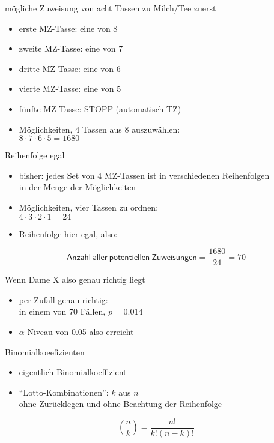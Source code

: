 \begin{frame}
  {mögliche Zuweisung von acht Tassen zu Milch\slash Tee zuerst}
  \begin{itemize}[<+->]
    \item erste MZ-Tasse: eine von 8
    \item zweite MZ-Tasse: eine von 7
    \item dritte MZ-Tasse: eine von 6
    \item vierte MZ-Tasse: eine von 5
    \item fünfte MZ-Tasse: STOPP (automatisch TZ)
    \item \alert{Möglichkeiten, 4 Tassen aus 8 auszuwählen:\\
      $8\cdot7\cdot6\cdot5=1680$}
  \end{itemize}
\end{frame}

\begin{frame}
  {Reihenfolge egal}
  \begin{itemize}[<+->]
    \item bisher: jedes Set von 4 MZ-Tassen ist in verschiedenen Reihenfolgen\\
      in der Menge der Möglichkeiten
    \item \alert{Möglichkeiten, vier Tassen zu ordnen:\\
      $4\cdot3\cdot2\cdot1=24$}
      \Zeile
    \item Reihenfolge hier egal, also:
  \end{itemize}
  \pause
  \begin{equation}
    \mathsf{Anzahl\ aller\ potentiellen\ Zuweisungen}=\frac{1680}{24}=70
  \end{equation}
\end{frame}

\begin{frame}
  {Wenn Dame X also genau richtig liegt}
  \begin{itemize}[<+->]
    \item per Zufall genau richtig:\\
      in einem von 70 Fällen, $p=0.014$
      \Zeile
    \item $\alpha$-Niveau von 0.05 also erreicht
  \end{itemize}
\end{frame}

\begin{frame}
  {Binomialkoeefizienten}
  \begin{itemize}[<+->]
    \item eigentlich \alert{Binomialkoeffizient}
    \item "`Lotto-Kombinationen"': $k$ aus $n$\\
      ohne Zurücklegen und ohne Beachtung der Reihenfolge
  \end{itemize}
  \Zeile
  \pause
  \begin{equation}
    \binom{n}{k}=\frac{n!}{k!(n-k)!}
  \end{equation}
\end{frame}

